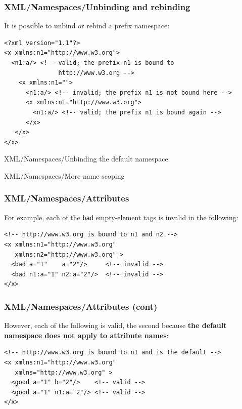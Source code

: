 %
\begin{frame}[containsverbatim]
\frametitle{XML/Namespaces/Unbinding and rebinding}

It is possible to unbind or rebind a prefix namespace:
{\small
\begin{verbatim}
<?xml version="1.1"?>
<x xmlns:n1="http://www.w3.org">
  <n1:a/> <!-- valid; the prefix n1 is bound to
               http://www.w3.org -->
    <x xmlns:n1="">
      <n1:a/> <!-- invalid; the prefix n1 is not bound here -->
      <x xmlns:n1="http://www.w3.org">
        <n1:a/> <!-- valid; the prefix n1 is bound again -->
      </x>
   </x>
</x>
\end{verbatim}
}

\end{frame}

%
\begin{frame}{XML/Namespaces/Unbinding the default namespace}


\end{frame}

%
\begin{frame}{XML/Namespaces/More name scoping}


\end{frame}

%
\begin{frame}[containsverbatim]
\frametitle{XML/Namespaces/Attributes}

For example, each of the \texttt{bad} empty-element tags is invalid in
the following:
\begin{verbatim}
<!-- http://www.w3.org is bound to n1 and n2 -->
<x xmlns:n1="http://www.w3.org"
   xmlns:n2="http://www.w3.org" >
  <bad a="1"    a="2"/>     <!-- invalid -->
  <bad n1:a="1" n2:a="2"/>  <!-- invalid -->
</x>
\end{verbatim}

\end{frame}

%
\begin{frame}[containsverbatim]
\frametitle{XML/Namespaces/Attributes (cont)}

However, each of the following is valid, the second because
\textbf{the default namespace does not apply to attribute names}:
{\small
\begin{verbatim}
<!-- http://www.w3.org is bound to n1 and is the default -->
<x xmlns:n1="http://www.w3.org"
   xmlns="http://www.w3.org" >
  <good a="1" b="2"/>    <!-- valid -->
  <good a="1" n1:a="2"/> <!-- valid -->
</x>
\end{verbatim}
}

\end{frame}

